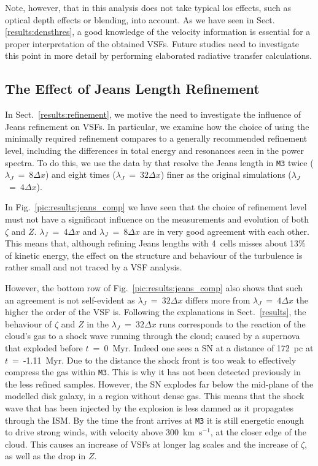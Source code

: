 Note, however, that in this analysis does not take typical los effects, such as optical depth effects or blending, into account. 
As we have seen in Sect.\ref{results:densthres}, a good knowledge of the velocity information is essential for a proper interpretation of the obtained VSFs.
Future studies need to investigate this point in more detail by performing elaborated radiative transfer calculations. 



\subsection{The Effect of Jeans Length Refinement}\label{discussion:refinement}

In Sect.~\ref{results:refinement}, we motive the need to investigate the influence of Jeans refinement on VSFs.
In particular, we examine how the choice of using the minimally required refinement compares to a generally recommended refinement level, including the differences in total energy and resonances seen in the power spectra. 
To do this, we use the data by  that resolve the Jeans length in \texttt{M3} twice ($\lambda_J$~=~$8\Delta{}x$) and eight times ($\lambda_J$~=~$32\Delta{}x$) finer as the original simulations ($\lambda_J$~=~$4\Delta{}x$).

In Fig.~\ref{pic:results:jeans_comp} we have seen that the choice of refinement level must not have a significant influence on the measurements and evolution of both $\zeta$ and $Z$. 
$\lambda_J$~=~$4\Delta{}x$ and $\lambda_J$~=~$8\Delta{}x$ are in very good agreement with each other.
This means that, although refining Jeans lengths with 4~cells misses about 13\% of kinetic energy, the effect on the structure and behaviour of the turbulence is rather small and not traced by a VSF analysis.

However, the bottom row of Fig.~\ref{pic:results:jeans_comp} also shows that such an agreement is not self-evident as $\lambda_J$~=~$32\Delta{}x$ differs more from $\lambda_J$~=~$4\Delta{}x$ the higher the order of the VSF is.
Following the explanations in Sect.~\ref{results}, the behaviour of $\zeta$ and $Z$ in the $\lambda_J$~=~$32\Delta{}x$ runs corresponds to the reaction of the cloud's gas to a shock wave running through the cloud; caused by a supernova that exploded before $t$~=~0~Myr. 
Indeed one sees a SN at a distance of 172~pc at $t$~=~-1.11~Myr. 
Due to the distance the shock front is too weak to effectively compress the gas within \texttt{M3}.
This is why it has not been detected previously in the less refined samples.
However, the SN explodes far below the mid-plane of the modelled disk galaxy, in a region without dense gas.
This means that the shock wave that has been injected by the explosion is less damned as it propagates through the ISM. 
By the time the front arrives at \texttt{M3} it is still energetic enough to drive strong winds, with velocity above 300~km~s$^{-1}$, at the closer edge of the cloud. 
This causes an increase of VSFs at longer lag scales and the increase of $\zeta$, as well as the drop in $Z$.

